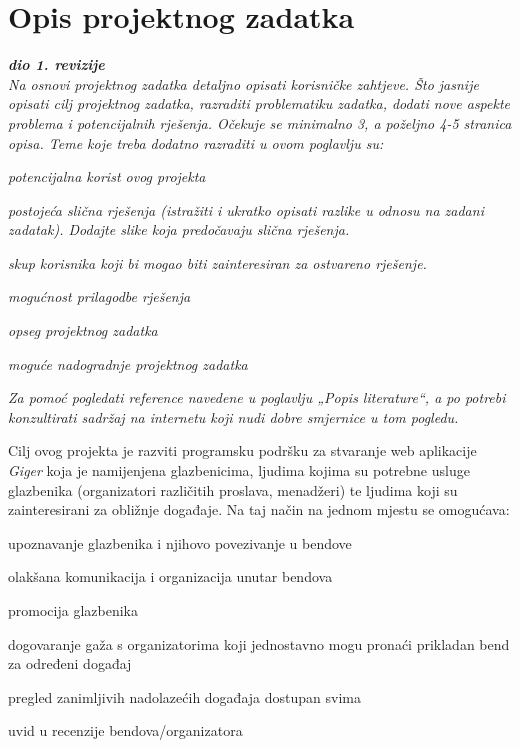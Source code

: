 \chapter{Opis projektnog zadatka}
		\textbf{\textit{dio 1. revizije}}\\
		
		\textit{Na osnovi projektnog zadatka detaljno opisati korisničke zahtjeve. Što jasnije opisati cilj projektnog zadatka, razraditi problematiku zadatka, dodati nove aspekte problema i potencijalnih rješenja. Očekuje se minimalno 3, a poželjno 4-5 stranica opisa.	Teme koje treba dodatno razraditi u ovom poglavlju su:}
		\begin{packed_item}
			\item \textit{potencijalna korist ovog projekta}
			\item \textit{postojeća slična rješenja (istražiti i ukratko opisati razlike u odnosu na zadani zadatak). Dodajte slike koja predočavaju slična rješenja.}
			\item \textit{skup korisnika koji bi mogao biti zainteresiran za ostvareno rješenje.}
			\item \textit{mogućnost prilagodbe rješenja }
			\item \textit{opseg projektnog zadatka}
			\item \textit{moguće nadogradnje projektnog zadatka}
		\end{packed_item}
		
		\textit{Za pomoć pogledati reference navedene u poglavlju „Popis literature“, a po potrebi konzultirati sadržaj na internetu koji nudi dobre smjernice u tom pogledu.}
		\eject
		
		Cilj ovog projekta je razviti programsku podršku za stvaranje web aplikacije \textit{Giger} koja je namijenjena glazbenicima, ljudima kojima su potrebne usluge glazbenika (organizatori različitih proslava, menadžeri) te ljudima koji su zainteresirani za obližnje događaje. Na taj način na jednom mjestu se omogućava:
		
		\begin{packed_item}
			\item upoznavanje glazbenika i njihovo povezivanje u bendove
			\item olakšana komunikacija i organizacija unutar bendova
			\item promocija glazbenika
			\item dogovaranje gaža s organizatorima koji jednostavno mogu pronaći prikladan bend za određeni događaj
			\item pregled zanimljivih nadolazećih događaja dostupan svima
			\item uvid u recenzije bendova/organizatora
		\end{packed_item}
	

